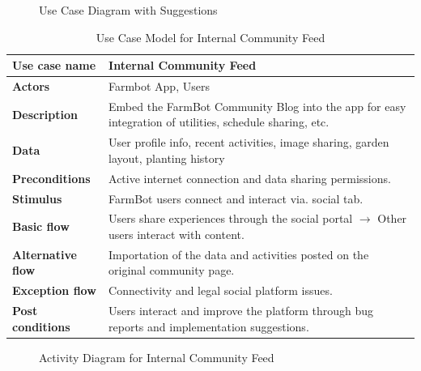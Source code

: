 \begin{figure}[H]
    \centering

\caption{Use Case Diagram with Suggestions}
\end{figure}

\begin{table}[H]
\centering
\footnotesize
\begin{tabular}{|p{3.5cm}|p{8.5cm}|}
\hline
\textbf{Use case name}    & Internal Community Feed\\
\hline
\textbf{Actors}           & Farmbot App, Users \\
\hline
\textbf{Description}      & Embed the FarmBot Community Blog into the app for easy integration of utilities, schedule sharing, etc. \\
\hline
\textbf{Data}             & User profile info, recent activities, image sharing, garden layout, planting history\\
\hline
\textbf{Preconditions}    & Active internet connection and data sharing permissions. \\
\hline
\textbf{Stimulus}         & FarmBot users connect and interact via. social tab. \\
\hline
\textbf{Basic flow}       & Users share experiences through the social portal $\rightarrow$ Other users interact with content. \\
\hline
\textbf{Alternative flow} & Importation of the data and activities posted on the original community page. \\
\hline
\textbf{Exception flow}   & Connectivity and legal social platform issues. \\
\hline
\textbf{Post conditions}  & Users interact and improve the platform through bug reports and implementation suggestions. \\
\hline
\end{tabular}
\caption{Use Case Model for Internal Community Feed}
\end{table}

\begin{figure}[H]
    \centering

\caption{Activity Diagram for Internal Community Feed}
\end{figure}

